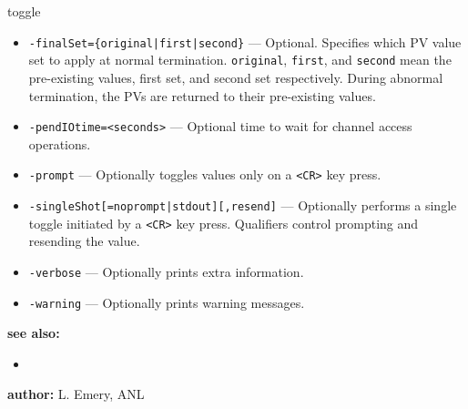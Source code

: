 \begin{sddsprog}{toggle}
\begin{itemize}
        \item {\tt -finalSet=\{original|first|second\}} --- Optional. Specifies which PV value set to apply at normal termination.
                 \verb+original+, \verb+first+, and \verb+second+ mean the pre-existing values, first set, and second set respectively.
                 During abnormal termination, the PVs are returned to their pre-existing values.
        \item {\tt -pendIOtime=<seconds>} --- Optional time to wait for channel access operations.
        \item {\tt -prompt} --- Optionally toggles values only on a \verb+<CR>+ key press.
        \item {\tt -singleShot[=noprompt|stdout][,resend]} --- Optionally performs a single toggle initiated by a \verb+<CR>+ key press. Qualifiers control prompting and resending the value.
        \item {\tt -verbose} --- Optionally prints extra information.
        \item {\tt -warning} --- Optionally prints warning messages.
    \end{itemize}

\item \textbf{see also:}
    \begin{itemize}
    \item {}
    \end{itemize}
\item \textbf{author:} L. Emery, ANL 
\end{sddsprog}
